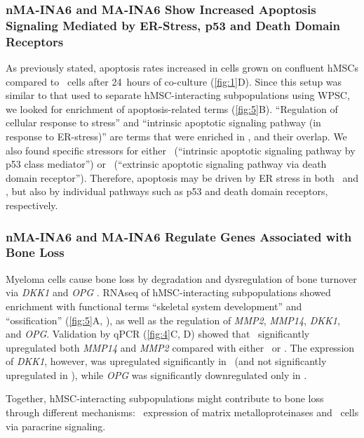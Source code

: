 \subsubsection*{nMA-INA6 and MA-INA6 Show Increased Apoptosis Signaling Mediated by ER-Stress, p53 and Death Domain Receptors}
As previously stated, apoptosis rates increased in \INA cells grown on confluent
hMSCs compared to \CMina\ cells after \SI{24}{hours} of co-culture
(\autoref{fig:1}D). Since this setup was similar to that used to separate
hMSC-interacting subpopulations using WPSC, we looked for enrichment of
apoptosis-related terms (\autoref{fig:5}B). “Regulation of cellular response to
stress” and “intrinsic apoptotic signaling pathway (in response to ER-stress)”
are terms that were enriched in ,  and their
overlap. We also found specific stressors for either \nMAina\ (“intrinsic
apoptotic signaling pathway by p53 class mediator”) or \MAina\ (“extrinsic
apoptotic signaling pathway via death domain receptor”). Therefore, apoptosis
may be driven by ER stress in both \nMAina\ and \MAina, but also by individual
pathways such as p53 and death domain receptors, respectively.


\subsubsection*{nMA-INA6 and MA-INA6 Regulate Genes Associated with Bone Loss}
Myeloma cells cause bone loss by degradation and dysregulation of bone turnover
via \textit{DKK1} and \textit{OPG}
\cite{standalOsteoprotegerinBoundInternalized2002,vanvalckenborghMultifunctionalRoleMatrix2004,zhouDickkopf1KeyRegulator2013}.
RNAseq of hMSC-interacting subpopulations showed enrichment with functional
terms ``skeletal system development'' and ``ossification'' (\autoref{fig:5}A,
), as well as the regulation of
\textit{MMP2}, \textit{MMP14}, \textit{DKK1}, and \textit{OPG}. Validation by
qPCR (\autoref{fig:4}C, D) showed that \MAina\ significantly upregulated both
\textit{MMP14} and \textit{MMP2} compared with either \nMAina\ or \CMina. The
expression of \textit{DKK1}, however, was upregulated significantly in \nMAina\
(and not significantly upregulated in \MAina), while \textit{OPG} was
significantly downregulated only in \nMAina.

Together, hMSC-interacting subpopulations might contribute to bone loss through
different mechanisms: \MAina\ expression of matrix metalloproteinases and
\nMAina\ cells via paracrine signaling.


